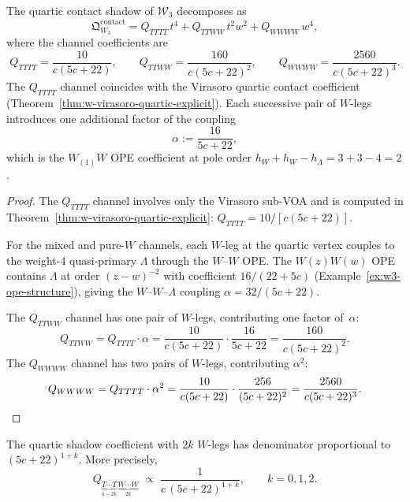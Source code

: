 \begin{theorem}
\label{thm:w3-quartic-channel-decomposition}
The quartic contact shadow of $\mathcal{W}_3$ decomposes as
\begin{equation}
\label{eq:w3-quartic-channels}
\mathfrak{Q}^{\mathrm{contact}}_{W_3}
= Q_{TTTT}\,t^4 + Q_{TTWW}\,t^2w^2 + Q_{WWWW}\,w^4,
\end{equation}
where the channel coefficients are
\begin{equation}
\label{eq:w3-quartic-coefficients}
Q_{TTTT} = \frac{10}{c(5c+22)},
\qquad
Q_{TTWW} = \frac{160}{c(5c+22)^2},
\qquad
Q_{WWWW} = \frac{2560}{c(5c+22)^3}.
\end{equation}
The $Q_{TTTT}$ channel coincides with the Virasoro quartic contact
coefficient
\textup{(}Theorem~\textup{\ref{thm:w-virasoro-quartic-explicit})}.
Each successive pair of $W$-legs introduces one additional factor of the
coupling
\begin{equation}
\label{eq:w3-wwlambda-coupling}
\alpha := \frac{16}{5c+22},
\end{equation}
which is the $W_{(1)}W$ OPE coefficient at pole order
$h_W + h_W - h_\Lambda = 3 + 3 - 4 = 2$.
\end{theorem}

\begin{proof}
The $Q_{TTTT}$ channel involves only the Virasoro sub-VOA and is
computed in Theorem~\ref{thm:w-virasoro-quartic-explicit}:
$Q_{TTTT} = 10/[c(5c+22)]$.

For the mixed and pure-$W$ channels, each $W$-leg at the quartic
vertex couples to the weight-$4$ quasi-primary $\Lambda$ through the
$W$--$W$ OPE.  The $W(z)W(w)$ OPE contains $\Lambda$ at order
$(z-w)^{-2}$ with coefficient $16/(22+5c)$
(Example~\ref{ex:w3-ope-structure}), giving the $W$--$W$--$\Lambda$
coupling $\alpha = 32/(5c+22)$.

The $Q_{TTWW}$ channel has one pair of $W$-legs, contributing
one factor of~$\alpha$:
\[
Q_{TTWW}
= Q_{TTTT} \cdot \alpha
= \frac{10}{c(5c+22)} \cdot \frac{16}{5c+22}
= \frac{160}{c(5c+22)^2}.
\]
The $Q_{WWWW}$ channel has two pairs of $W$-legs, contributing
$\alpha^2$:
\[
Q_{WWWW}
= Q_{TTTT} \cdot \alpha^2
= \frac{10}{c(5c+22)} \cdot \frac{256}{(5c+22)^2}
= \frac{2560}{c(5c+22)^3}. \qedhere
\]
\end{proof}

\begin{proposition}
\label{prop:w3-denominator-filtration}
The quartic shadow coefficient with $2k$ $W$-legs has denominator
proportional to $(5c+22)^{1+k}$.  More precisely,
\begin{equation}
\label{eq:w3-denominator-filtration}
Q_{\underbrace{T\cdots T}_{4-2k}\,\underbrace{W\cdots W}_{2k}}
\;\propto\;
\frac{1}{c\,(5c+22)^{1+k}},
\qquad k = 0,1,2.
\end{equation}
\end{proposition}

